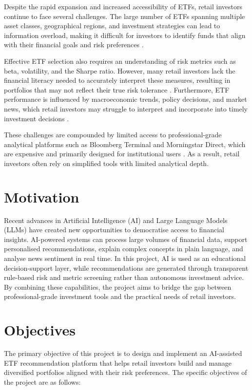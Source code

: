 Despite the rapid expansion and increased accessibility of ETFs, retail investors continue to face several challenges. The large number of ETFs spanning multiple asset classes, geographical regions, and investment strategies can lead to information overload, making it difficult for investors to identify funds that align with their financial goals and risk preferences \cite{efma2024}.

Effective ETF selection also requires an understanding of risk metrics such as beta, volatility, and the Sharpe ratio. However, many retail investors lack the financial literacy needed to accurately interpret these measures, resulting in portfolios that may not reflect their true risk tolerance \cite{lusardi2014}. Furthermore, ETF performance is influenced by macroeconomic trends, policy decisions, and market news, which retail investors may struggle to interpret and incorporate into timely investment decisions \cite{seath2025}.

These challenges are compounded by limited access to professional-grade analytical platforms such as Bloomberg Terminal and Morningstar Direct, which are expensive and primarily designed for institutional users \cite{seath2025}. As a result, retail investors often rely on simplified tools with limited analytical depth.

\section{Motivation}

Recent advances in Artificial Intelligence (AI) and Large Language Models (LLMs) have created new opportunities to democratise access to financial insights. AI-powered systems can process large volumes of financial data, support personalised recommendations, explain complex concepts in plain language, and analyse news sentiment in real time. In this project, AI is used as an educational decision-support layer, while recommendations are generated through transparent rule-based risk and metric screening rather than autonomous investment advice. By combining these capabilities, the project aims to bridge the gap between professional-grade investment tools and the practical needs of retail investors.

\section{Objectives}

The primary objective of this project is to design and implement an AI-assisted ETF recommendation platform that helps retail investors build and manage diversified portfolios aligned with their risk preferences. The specific objectives of the project are as follows:

